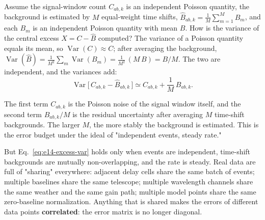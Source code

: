 Assume the signal-window count $C_{ab,k}$ is an independent Poisson quantity, the background is estimated by $M$ equal-weight time shifts, $\widehat B_{ab,k}=\frac1M\sum_{m=1}^{M}B_m$, and each $B_m$ is an independent Poisson quantity with mean $B$. How is the variance of the central excess $X=C-\widehat B$ computed? The variance of a Poisson quantity equals its mean, so $\operatorname{Var}(C)\approx C$; after averaging the background, $\operatorname{Var}(\widehat B)=\frac1{M^2}\sum_m\operatorname{Var}(B_m)=\frac1{M^2}\,(M\,B)=B/M$. The two are independent, and the variances add:
\begin{equation}
  \operatorname{Var}\!\big[\,C_{ab,k}-\widehat B_{ab,k}\,\big]
  \simeq C_{ab,k}+\frac{1}{M}\,B_{ab,k} .
  \label{eq:e14-excess-var}
\end{equation}
\begin{formulaexplain}
The first term $C_{ab,k}$ is the Poisson noise of the signal window itself, and the second term $B_{ab,k}/M$ is the residual uncertainty after averaging $M$ time-shift backgrounds. The larger $M$, the more stably the background is estimated. This is the error budget under the ideal of "independent events, steady rate."
\end{formulaexplain}
But Eq.~\eqref{eq:e14-excess-var} holds only when events are independent, time-shift backgrounds are mutually non-overlapping, and the rate is steady. Real data are full of "sharing" everywhere: adjacent delay cells share the same batch of events; multiple baselines share the same telescope; multiple wavelength channels share the same weather and the same gain path; multiple model points share the same zero-baseline normalization. Anything that is shared makes the errors of different data points \textbf{correlated}: the error matrix is no longer diagonal.

